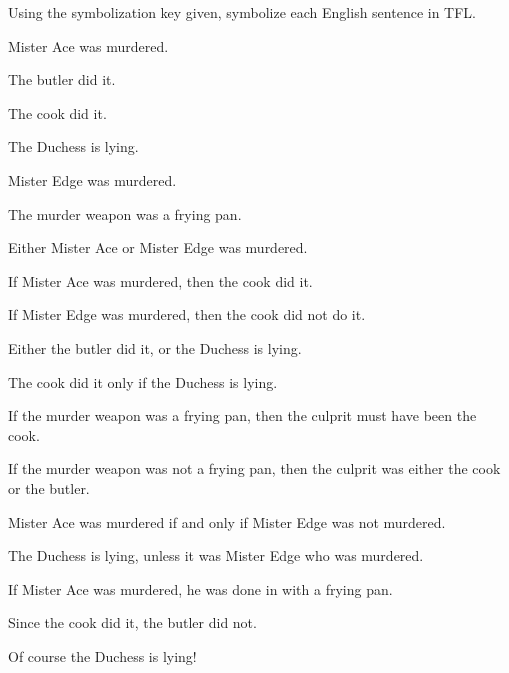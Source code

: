 \begin{practiceproblems}
\problempart Using the symbolization key given, symbolize each English sentence in TFL.
\begin{ekey}
\item[A] Mister Ace was murdered.
\item[B] The butler did it.
\item[C] The cook did it.
\item[D] The Duchess is lying.
\item[E] Mister Edge was murdered.
\item[F] The murder weapon was a frying pan.
\end{ekey}
\begin{problemslist}
\item Either Mister Ace or Mister Edge was murdered.
\item If Mister Ace was murdered, then the cook did it.
\item If Mister Edge was murdered, then the cook did not do it.
\item Either the butler did it, or the Duchess is lying.
\item The cook did it only if the Duchess is lying.
\item If the murder weapon was a frying pan, then the culprit must have been the cook.
\item If the murder weapon was not a frying pan, then the culprit was either the cook or the butler.
\item Mister Ace was murdered if and only if Mister Edge was not murdered.
\item The Duchess is lying, unless it was Mister Edge who was murdered.
\item If Mister Ace was murdered, he was done in with a frying pan.
\item Since the cook did it, the butler did not.
\item Of course the Duchess is lying!
\end{problemslist}



\end{practiceproblems}
